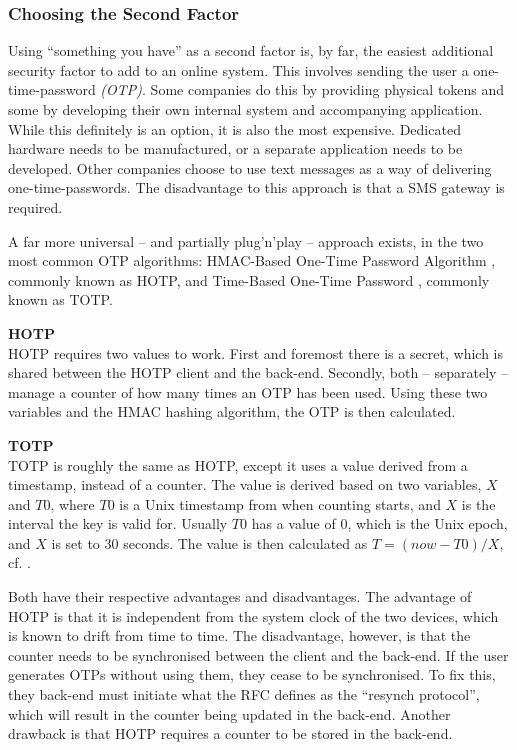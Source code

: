 			\subsubsection{Choosing the Second Factor}
				Using ``something you have'' as a second factor is, by far, the easiest additional security factor to add to an online system. This involves sending the user a one-time-password \emph{(OTP)}. Some companies do this by providing physical tokens and some by developing their own internal system and accompanying application. While this definitely is an option, it is also the most expensive. Dedicated hardware needs to be manufactured, or a separate application needs to be developed. Other companies choose to use text messages as a way of delivering one-time-passwords. The disadvantage to this approach is that a SMS gateway is required.

				A far more universal -- and partially plug'n'play -- approach exists, in the two most common OTP algorithms: HMAC-Based One-Time Password Algorithm \cite{rfc4226}, commonly known as HOTP, and Time-Based One-Time Password \cite{rfc6238}, commonly known as TOTP. 

				\textbf{HOTP}\\
				HOTP requires two values to work. First and foremost there is a secret, which is shared between the HOTP client and the back-end. Secondly, both -- separately -- manage a counter of how many times an OTP has been used. Using these two variables and the HMAC hashing algorithm, the OTP is then calculated. 

				\textbf{TOTP}\\
				TOTP is roughly the same as HOTP, except it uses a value derived from a timestamp, instead of a counter. The value is derived based on two variables, $X$ and $T0$, where $T0$ is a Unix timestamp from when counting starts, and $X$ is the interval the key is valid for. Usually $T0$ has a value of $0$, which is the Unix epoch, and $X$ is set to $30$ seconds. The value is then calculated as $T = (now - T0)/X$, cf. \cite[Sec. 4.2]{rfc6238}.

				Both have their respective advantages and disadvantages. The advantage of HOTP is that it is independent from the system clock of the two devices, which is known to drift from time to time. The disadvantage, however, is that the counter needs to be synchronised between the client and the back-end. If the user generates OTPs without using them, they cease to be synchronised. To fix this, they back-end must initiate what the RFC defines as the ``resynch protocol'', which will result in the counter being updated in the back-end. Another drawback is that HOTP requires a counter to be stored in the back-end.

